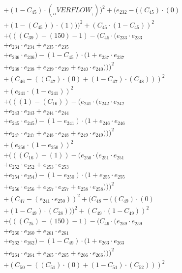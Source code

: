 \documentclass[10pt, a4paper]{article}
\begin{document}
\begin{small}
\begin{align*}
& + (1 - C_{45})  \cdot  (__OVERFLOW__)))^{2} + (e_{232} - ((C_{45}) \cdot (0) \\
& + (1 - (C_{45})) \cdot (1)))^{2} + (C_{45} \cdot (1 - C_{45}))^{2} \\
& + (((C_{39}) - (150) - 1) - (C_{45} \cdot (e_{233} \cdot e_{233} \\
& + e_{234} \cdot e_{234} + e_{235} \cdot e_{235} \\
& + e_{236} \cdot e_{236}) - (1 - C_{45}) \cdot (1 + e_{237} \cdot e_{237} \\
& + e_{238} \cdot e_{238} + e_{239} \cdot e_{239} + e_{240} \cdot e_{240})))^{2} \\
& + (C_{46} - ((C_{47})  \cdot  (0) + (1 - C_{47})  \cdot  (C_{48})))^{2} \\
& + (e_{241} \cdot (1 - e_{241}))^{2} \\
& + (((1) - (C_{16})) - (e_{241} \cdot (e_{242} \cdot e_{242} \\
& + e_{243} \cdot e_{243} + e_{244} \cdot e_{244} \\
& + e_{245} \cdot e_{245}) - (1 - e_{241}) \cdot (1 + e_{246} \cdot e_{246} \\
& + e_{247} \cdot e_{247} + e_{248} \cdot e_{248} + e_{249} \cdot e_{249})))^{2} \\
& + (e_{250} \cdot (1 - e_{250}))^{2} \\
& + (((C_{16}) - (1)) - (e_{250} \cdot (e_{251} \cdot e_{251} \\
& + e_{252} \cdot e_{252} + e_{253} \cdot e_{253} \\
& + e_{254} \cdot e_{254}) - (1 - e_{250}) \cdot (1 + e_{255} \cdot e_{255} \\
& + e_{256} \cdot e_{256} + e_{257} \cdot e_{257} + e_{258} \cdot e_{258})))^{2} \\
& + (C_{47} - (e_{241} \cdot e_{250}))^{2} + (C_{48} - ((C_{49})  \cdot  (0) \\
& + (1 - C_{49})  \cdot  (C_{28})))^{2} + (C_{49} \cdot (1 - C_{49}))^{2} \\
& + (((C_{25}) - (150) - 1) - (C_{49} \cdot (e_{259} \cdot e_{259} \\
& + e_{260} \cdot e_{260} + e_{261} \cdot e_{261} \\
& + e_{262} \cdot e_{262}) - (1 - C_{49}) \cdot (1 + e_{263} \cdot e_{263} \\
& + e_{264} \cdot e_{264} + e_{265} \cdot e_{265} + e_{266} \cdot e_{266})))^{2} \\
& + (C_{50} - ((C_{51})  \cdot  (0) + (1 - C_{51})  \cdot  (C_{52})))^{2} \\

\end{align*}
\end{small}
\end{document}
